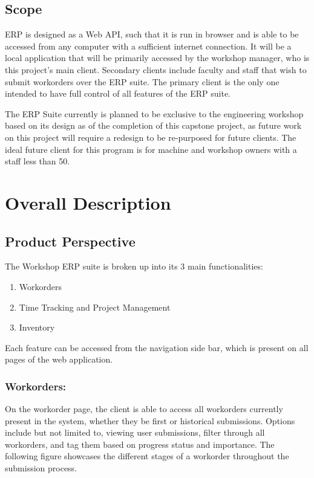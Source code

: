 \subsection{Scope}
ERP is designed as a Web API, such that it is run in browser and is able to be accessed from any computer with a sufficient internet connection. It will be a local application that will be primarily accessed by the workshop manager, who is this project's main client. Secondary clients include faculty and staff that wish to submit workorders over the ERP suite. The primary client is the only one intended to have full control of all features of the ERP suite. 
\newline
{\setlength{\parindent}{0cm}

The ERP Suite currently is planned to be exclusive to the engineering workshop based on its design as of the completion of this capstone project, as future work on this project will require a redesign to be re-purposed for future clients. The ideal future client for this program is for machine and workshop owners with a staff less than 50.  

\newpage

\section{Overall Description}
\subsection{Product Perspective}
The Workshop ERP suite is broken up into its 3 main functionalities: 

	\begin{enumerate}
	\item Workorders
	\item Time Tracking and Project Management 
	\item Inventory
	\end{enumerate}

Each feature can be accessed from the navigation side bar, which is present on all pages of the web application. 

\subsubsection*{Workorders:}
On the workorder page, the client is able to access all workorders currently present in the system, whether they be first or historical submissions. Options include but not limited to, viewing user submissions, filter through all workorders, and tag them based on progress status and importance. The following figure showcases the different stages of a workorder throughout the submission process.
 
}
